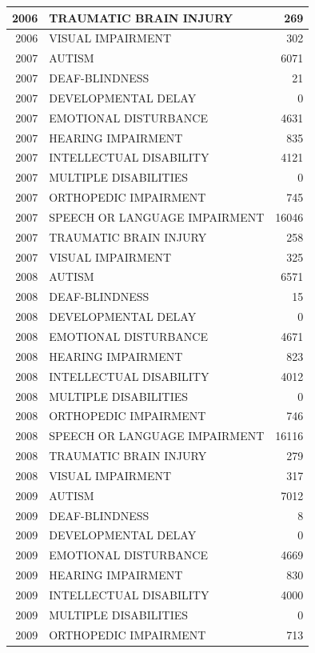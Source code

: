 \documentclass[
  english,
  man]{apa6}
\begin{document}
\begin{tabular}{r|l|r}
\hline
2006 & TRAUMATIC BRAIN INJURY & 269\\
\hline
2006 & VISUAL IMPAIRMENT & 302\\
\hline
2007 & AUTISM & 6071\\
\hline
2007 & DEAF-BLINDNESS & 21\\
\hline
2007 & DEVELOPMENTAL DELAY & 0\\
\hline
2007 & EMOTIONAL DISTURBANCE & 4631\\
\hline
2007 & HEARING IMPAIRMENT & 835\\
\hline
2007 & INTELLECTUAL DISABILITY & 4121\\
\hline
2007 & MULTIPLE DISABILITIES & 0\\
\hline
2007 & ORTHOPEDIC IMPAIRMENT & 745\\
\hline
2007 & SPEECH OR LANGUAGE IMPAIRMENT & 16046\\
\hline
2007 & TRAUMATIC BRAIN INJURY & 258\\
\hline
2007 & VISUAL IMPAIRMENT & 325\\
\hline
2008 & AUTISM & 6571\\
\hline
2008 & DEAF-BLINDNESS & 15\\
\hline
2008 & DEVELOPMENTAL DELAY & 0\\
\hline
2008 & EMOTIONAL DISTURBANCE & 4671\\
\hline
2008 & HEARING IMPAIRMENT & 823\\
\hline
2008 & INTELLECTUAL DISABILITY & 4012\\
\hline
2008 & MULTIPLE DISABILITIES & 0\\
\hline
2008 & ORTHOPEDIC IMPAIRMENT & 746\\
\hline
2008 & SPEECH OR LANGUAGE IMPAIRMENT & 16116\\
\hline
2008 & TRAUMATIC BRAIN INJURY & 279\\
\hline
2008 & VISUAL IMPAIRMENT & 317\\
\hline
2009 & AUTISM & 7012\\
\hline
2009 & DEAF-BLINDNESS & 8\\
\hline
2009 & DEVELOPMENTAL DELAY & 0\\
\hline
2009 & EMOTIONAL DISTURBANCE & 4669\\
\hline
2009 & HEARING IMPAIRMENT & 830\\
\hline
2009 & INTELLECTUAL DISABILITY & 4000\\
\hline
2009 & MULTIPLE DISABILITIES & 0\\
\hline
2009 & ORTHOPEDIC IMPAIRMENT & 713\\

\end{tabular}
\end{document}
